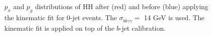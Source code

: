\begin{figure}[htbp]
   \centering
   \begin{tcolorbox}[colback=black!5!white,colframe=white!75!black]
   \caption{$p_x$ and $p_y$ distributions of HH after (red) and before (blue) applying the kinematic fit for 0-jet events. The $\sigma_{b\bar{b}\gamma\gamma} = $ 14 GeV is used. The kinematic fit is applied on top of the $b$-jet calibration.}
   \label{fig:Adx4:HH:0Jet}
   \end{tcolorbox}
   
\end{figure}
